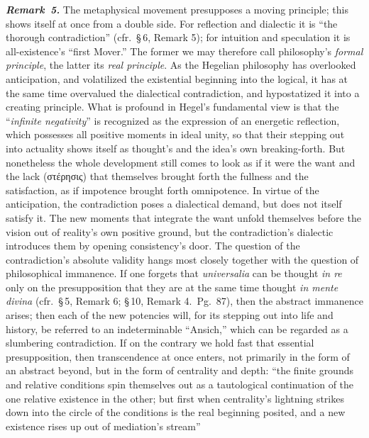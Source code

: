 \documentclass[12pt]{book}
\newcommand{\anm}[1]{\emph{\textbf{Remark~#1.}}}
\begin{document}
\anm{5} The metaphysical movement presupposes a moving principle; this shows
itself at once from a double side. For reflection and dialectic it is ``the
thorough contradiction'' (cfr.\ \S\,6, Remark 5); for intuition and
speculation it is all-existence's ``first Mover.'' The former we may
therefore call philosophy's \emph{formal principle}, the latter its
\emph{real principle}. As the Hegelian philosophy has overlooked
anticipation, and volatilized the existential beginning into the logical, it
has at the same time overvalued the dialectical contradiction, and
hypostatized it into a creating principle. What is profound in Hegel's
fundamental view is that the ``\emph{infinite negativity}'' is recognized as
the expression of an energetic reflection, which possesses all positive
moments in ideal unity, so that their stepping out into actuality shows
itself as thought's and the idea's own breaking-forth. But nonetheless the
whole development still comes to look as if it were the want and the lack
(στέρησις) that themselves brought forth the fullness and the satisfaction,
as if impotence brought forth omnipotence. In virtue of the anticipation,
the contradiction poses a dialectical demand, but does not itself satisfy
it. The new moments that integrate the want unfold themselves before the
vision out of reality's own positive ground, but the contradiction's
dialectic introduces them by opening consistency's door. The question of the
contradiction's absolute validity hangs most closely together with the
question of philosophical immanence. If one forgets that
\textit{universalia} can be thought \textit{in re} only on the
presupposition that they are at the same time thought \textit{in mente
divina} (cfr.\ \S\,5, Remark 6; \S\,10, Remark 4.\ Pg.\ 87), then the
abstract immanence arises; then each of the new potencies will, for its
stepping out into life and history, be referred to an indeterminable
``Ansich,'' which can be regarded as a slumbering contradiction.
If on the contrary we hold fast that essential presupposition, then
transcendence at once enters, not primarily in the form of an abstract
beyond, but in the form of centrality and depth: ``the finite grounds and
relative conditions spin themselves out as a tautological continuation of
the one relative existence in the other; but first when centrality's
lightning strikes down into the circle of the conditions is the real
beginning posited, and a new existence rises up out of mediation's stream''
\end{document}
